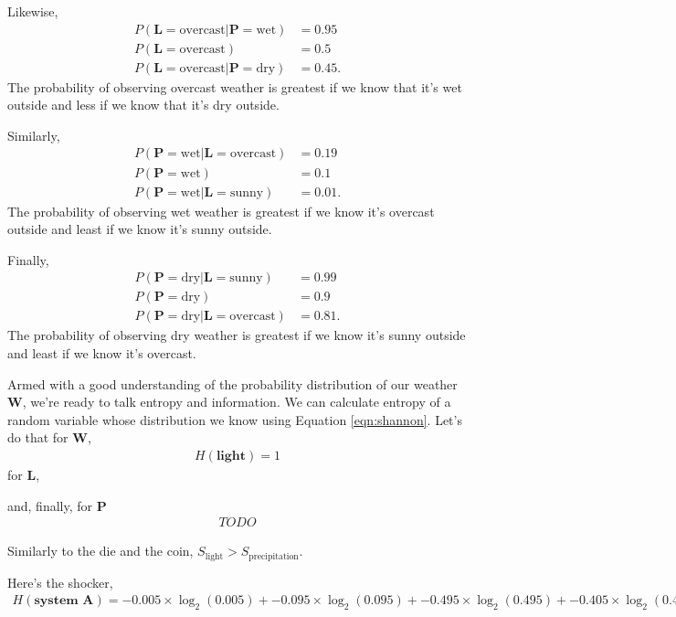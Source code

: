 Likewise,
\begin{align*}
P(\bm{L} = \text{overcast} | \bm{P} = \text{wet}) &= 0.95 \\
P(\bm{L} = \text{overcast}) &= 0.5 \\
P(\bm{L} = \text{overcast} | \bm{P} = \text{dry}) &= 0.45.
\end{align*}
The probability of observing overcast weather is greatest if we know that it's wet outside and less if we know that it's dry outside.

Similarly,
\begin{align*}
P(\bm{P} = \text{wet} | \bm{L} = \text{overcast}) &= 0.19 \\
P(\bm{P} = \text{wet}) &= 0.1 \\
P(\bm{P} = \text{wet} | \bm{L} = \text{sunny}) &= 0.01.
\end{align*}
The probability of observing wet weather is greatest if we know it's overcast outside and least if we know it's sunny outside.

Finally,
\begin{align*}
P(\bm{P} = \text{dry} | \bm{L} = \text{sunny}) &= 0.99 \\
P(\bm{P} = \text{dry}) &= 0.9 \\
P(\bm{P} = \text{dry} | \bm{L} = \text{overcast}) &= 0.81.
\end{align*}
The probability of observing dry weather is greatest if we know it's sunny outside and least if we know it's overcast.

Armed with a good understanding of the probability distribution of our weather $\bm{W}$, we're ready to talk entropy and information.
We can calculate entropy of a random variable whose distribution we know using Equation \ref{eqn:shannon}.
Let's do that for $\bm{W}$,
\begin{align*}
H(\textbf{light}) = 1
\end{align*}
for $\bm{L}$,

and, finally, for $\bm{P}$
\begin{align*}
TODO
\end{align*}

Similarly to the die and the coin, $S_{\text{light}} > S_{\text{precipitation}}$.

Here's the shocker,
\begin{align*}
H(\textbf{system A})
= - 0.005 \times \log_2(0.005)
+ - 0.095 \times \log_2(0.095)
+ - 0.495 \times \log_2(0.495)
+ - 0.405 \times \log_2(0.405)
\approx 1.391
\end{align*}

